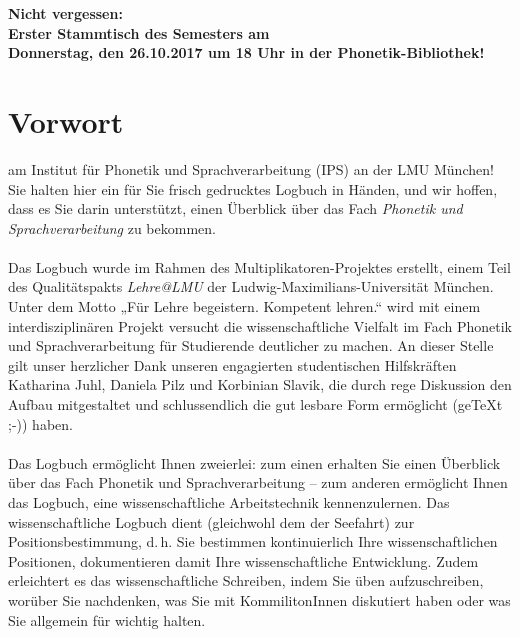 \documentclass[11pt]{book}
\begin{document}
\begin{titlepage}
\begin{center}
\newpage

\textbf {Nicht vergessen:\\Erster Stammtisch des Semesters am\\Donnerstag, den 26.10.2017 um 18 Uhr in der Phonetik-Bibliothek!}

\end{center}
\end{titlepage}
\thispagestyle{empty}
\tableofcontents

\chapter{Vorwort}
 am Institut für Phonetik und Sprachverarbeitung (IPS) an der LMU München!
Sie halten hier ein für Sie frisch gedrucktes Logbuch in Händen, und wir hoffen, dass es Sie darin unterstützt, einen Überblick über das Fach \emph{Phonetik und Sprachverarbeitung} zu bekommen.\\
\\
Das Logbuch wurde im Rahmen des Multiplikatoren-Projektes erstellt, einem Teil des Qualitätspakts \emph{Lehre@LMU} der Ludwig-Maximilians-Universität München. Unter dem Motto „Für Lehre begeistern. Kompetent lehren.“ wird mit einem interdisziplinären Projekt versucht die wissenschaftliche Vielfalt im Fach Phonetik und Sprachverarbeitung für Studierende deutlicher zu machen. An dieser Stelle gilt unser herzlicher Dank unseren engagierten studentischen Hilfskräften Katharina Juhl, Daniela Pilz und Korbinian Slavik, die durch rege Diskussion den Aufbau mitgestaltet und schlussendlich die gut lesbare Form ermöglicht (ge\TeX{}t ;-)) haben.\\
\\
Das Logbuch ermöglicht Ihnen zweierlei: zum einen erhalten Sie einen Überblick über das Fach Phonetik und Sprachverarbeitung – zum anderen ermöglicht Ihnen das Logbuch, eine wissenschaftliche Arbeitstechnik kennenzulernen. Das wissenschaftliche Logbuch dient (gleichwohl dem der Seefahrt) zur Positionsbestimmung, d.\,h. Sie bestimmen kontinuierlich Ihre wissenschaftlichen Positionen, dokumentieren damit Ihre wissenschaftliche Entwicklung. Zudem erleichtert es das wissenschaftliche Schreiben, indem Sie üben aufzuschreiben, worüber Sie nachdenken, was Sie mit KommilitonInnen diskutiert haben oder was Sie allgemein für wichtig halten.\\
\\
\end{document}
